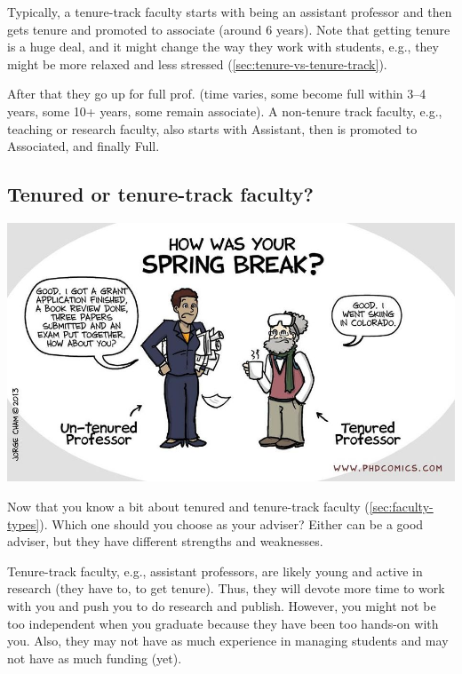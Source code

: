 \documentclass[oneside,11pt,dvipsnames]{book}
\begin{document}
Typically, a tenure-track faculty starts with being an assistant professor and then gets tenure and promoted to associate (around 6 years). Note that getting tenure is a huge deal, and it might change the way they work with students, e.g., they might be more relaxed and less stressed (\autoref{sec:tenure-vs-tenure-track}).

After that they go up for full prof. (time varies, some become full within 3--4 years, some 10+ years, some remain associate). A non-tenure track faculty, e.g., teaching or research faculty, also starts with Assistant, then is promoted to Associated, and finally Full.




\subsection{Tenured or tenure-track faculty?}\label{sec:tenure-vs-tenure-track}

\begin{center}
  \includegraphics[scale=0.4]{files/c8.png}
\end{center}

Now that you know a bit about tenured and tenure-track faculty (\autoref{sec:faculty-types}).  Which one should you choose as your adviser? 
Either can be a good adviser, but they have different strengths and weaknesses.


Tenure-track faculty, e.g., assistant professors, are likely young and active in research (they have to, to get tenure). Thus, they will devote more time to work with you and push you to do research and publish. However, you might not be too independent when you graduate because they have been too hands-on with you.  Also, they may not have as much experience in managing students and may not have as much funding (yet).
\end{document}

